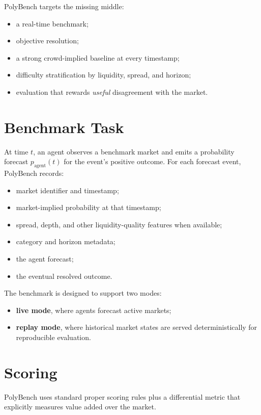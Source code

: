 \documentclass[10pt]{article}
\begin{document}
PolyBench targets the missing middle:
\begin{itemize}[leftmargin=1.5em,itemsep=0.2em]
  \item a real-time benchmark;
  \item objective resolution;
  \item a strong crowd-implied baseline at every timestamp;
  \item difficulty stratification by liquidity, spread, and horizon;
  \item evaluation that rewards \emph{useful} disagreement with the market.
\end{itemize}

\section{Benchmark Task}

At time $t$, an agent observes a benchmark market and emits a probability
forecast $p_{\text{agent}}(t)$ for the event's positive outcome. For each
forecast event, PolyBench records:
\begin{itemize}[leftmargin=1.5em,itemsep=0.2em]
  \item market identifier and timestamp;
  \item market-implied probability at that timestamp;
  \item spread, depth, and other liquidity-quality features when available;
  \item category and horizon metadata;
  \item the agent forecast;
  \item the eventual resolved outcome.
\end{itemize}

The benchmark is designed to support two modes:
\begin{itemize}[leftmargin=1.5em,itemsep=0.2em]
  \item \textbf{live mode}, where agents forecast active markets;
  \item \textbf{replay mode}, where historical market states are served
  deterministically for reproducible evaluation.
\end{itemize}

\section{Scoring}

PolyBench uses standard proper scoring rules plus a differential metric that
explicitly measures value added over the market.
\end{document}
